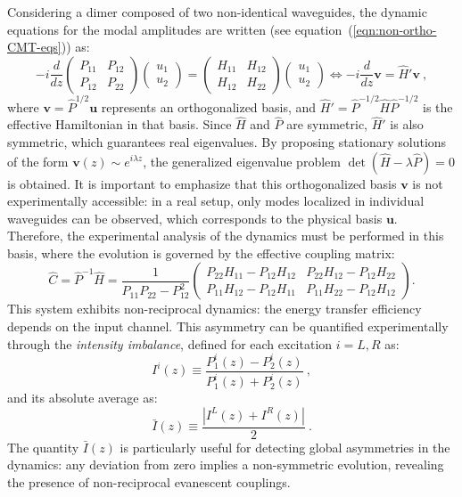 Considering a dimer composed of two non-identical waveguides, the dynamic equations for the modal amplitudes are written (see equation~(\ref{eqn:non-ortho-CMT-eqs})) as:
\begin{equation}
	-i
	\frac{d}{dz}
	\begin{pmatrix}
		P_{11} & P_{12} \\
		P_{12} & P_{22}
	\end{pmatrix}
	\begin{pmatrix}
		u_1 \\
		u_2
	\end{pmatrix}
	=
	\begin{pmatrix}
		H_{11} & H_{12} \\
		H_{12} & H_{22}
	\end{pmatrix}
	\begin{pmatrix}
		u_1 \\
		u_2
	\end{pmatrix}
	\iff
	-i\frac{d}{dz}\textbf{v} = \hat{H}' \textbf{v} \ ,
\end{equation}
where \( \textbf{v} = \hat{P}^{1/2} \textbf{u} \) represents an orthogonalized basis, and \( \hat{H}' = \hat{P}^{-1/2} \hat{H} \hat{P}^{-1/2} \) is the effective Hamiltonian in that basis. Since \( \hat{H} \) and \( \hat{P} \) are symmetric, \( \hat{H}' \) is also symmetric, which guarantees real eigenvalues. By proposing stationary solutions of the form \( \textbf{v}(z) \sim e^{i\lambda z} \), the generalized eigenvalue problem $\det(\hat{H} - \lambda \hat{P}) = 0$  is obtained.
It is important to emphasize that this orthogonalized basis \( \textbf{v} \) is not experimentally accessible: in a real setup, only modes localized in individual waveguides can be observed, which corresponds to the physical basis \( \textbf{u} \). Therefore, the experimental analysis of the dynamics must be performed in this basis, where the evolution is governed by the effective coupling matrix:
\begin{equation*}
	\hat{C} = \hat{P}^{-1} \hat{H} = \frac{1}{P_{11}P_{22} - P_{12}^2}
	\begin{pmatrix}
		P_{22}H_{11} - P_{12}H_{12} & P_{22}H_{12} - P_{12}H_{22} \\
		P_{11}H_{12} - P_{12}H_{11} & P_{11}H_{22} - P_{12}H_{12}
	\end{pmatrix}.
\end{equation*}
This system exhibits non-reciprocal dynamics: the energy transfer efficiency depends on the input channel. This asymmetry can be quantified experimentally through the \textit{intensity imbalance}, defined for each excitation \( i = L, R \) as:
\begin{equation*}
	I^i(z) \equiv \frac{P^i_1(z) - P^i_2(z)}{P^i_1(z) + P^i_2(z)} \ ,
\end{equation*}
and its absolute average as:
\begin{equation*}
	\bar{I}(z) \equiv \frac{|I^L(z) + I^R(z)|}{2} \ .
\end{equation*}
The quantity \( \bar{I}(z) \) is particularly useful for detecting global asymmetries in the dynamics: any deviation from zero implies a non-symmetric evolution, revealing the presence of non-reciprocal evanescent couplings.

